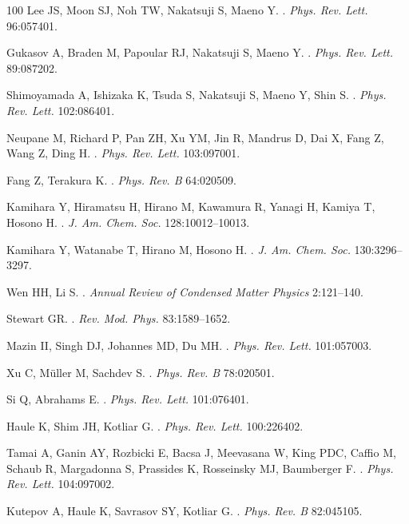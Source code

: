 \documentclass[]{ar2e-changed}%
\begin{document}
\begin{thebibliography}{100}
Lee JS, Moon SJ, Noh TW, Nakatsuji S, Maeno Y.
.
\newblock \emph{Phys. Rev. Lett.} 96:057401.

Gukasov A, Braden M, Papoular RJ, Nakatsuji S, Maeno Y.
.
\newblock \emph{Phys. Rev. Lett.} 89:087202.

Shimoyamada A, Ishizaka K, Tsuda S, Nakatsuji S, Maeno Y, Shin S.
.
\newblock \emph{Phys. Rev. Lett.} 102:086401.

Neupane M, Richard P, Pan ZH, Xu YM, Jin R, Mandrus D, Dai X, Fang Z, Wang Z,
  Ding H.
.
\newblock \emph{Phys. Rev. Lett.} 103:097001.

Fang Z, Terakura K.
.
\newblock \emph{Phys. Rev. B} 64:020509.

Kamihara Y, Hiramatsu H, Hirano M, Kawamura R, Yanagi H, Kamiya T, Hosono H.
.
\newblock \emph{J. Am. Chem. Soc.} 128:10012--10013.

Kamihara Y, Watanabe T, Hirano M, Hosono H.
.
\newblock \emph{J. Am. Chem. Soc.} 130:3296--3297.

Wen HH, Li S.
.
\newblock \emph{Annual Review of Condensed Matter Physics} 2:121--140.

Stewart GR.
.
\newblock \emph{Rev. Mod. Phys.} 83:1589--1652.

Mazin II, Singh DJ, Johannes MD, Du MH.
.
\newblock \emph{Phys. Rev. Lett.} 101:057003.

Xu C, M\"uller M, Sachdev S.
.
\newblock \emph{Phys. Rev. B} 78:020501.

Si Q, Abrahams E.
.
\newblock \emph{Phys. Rev. Lett.} 101:076401.

Haule K, Shim JH, Kotliar G.
.
\newblock \emph{Phys. Rev. Lett.} 100:226402.

Tamai A, Ganin AY, Rozbicki E, Bacsa J, Meevasana W, King PDC, Caffio M, Schaub
  R, Margadonna S, Prassides K, Rosseinsky MJ, Baumberger F.
.
\newblock \emph{Phys. Rev. Lett.} 104:097002.

Kutepov A, Haule K, Savrasov SY, Kotliar G.
.
\newblock \emph{Phys. Rev. B} 82:045105.


\end{thebibliography}
\end{document}
